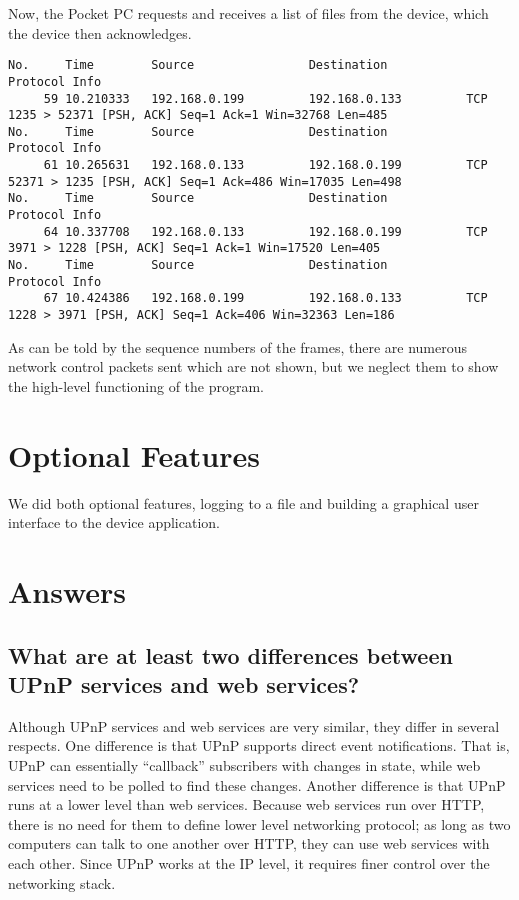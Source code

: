 \documentclass[11pt]{report}
\newcommand{\Section}[1]{\newpage \section{#1}}
\begin{document}
Now, the Pocket PC requests and receives a list of files from the device, which the device then acknowledges.

\begin{verbatim}
No.     Time        Source                Destination           Protocol Info
     59 10.210333   192.168.0.199         192.168.0.133         TCP      1235 > 52371 [PSH, ACK] Seq=1 Ack=1 Win=32768 Len=485
No.     Time        Source                Destination           Protocol Info
     61 10.265631   192.168.0.133         192.168.0.199         TCP      52371 > 1235 [PSH, ACK] Seq=1 Ack=486 Win=17035 Len=498
No.     Time        Source                Destination           Protocol Info
     64 10.337708   192.168.0.133         192.168.0.199         TCP      3971 > 1228 [PSH, ACK] Seq=1 Ack=1 Win=17520 Len=405
No.     Time        Source                Destination           Protocol Info
     67 10.424386   192.168.0.199         192.168.0.133         TCP      1228 > 3971 [PSH, ACK] Seq=1 Ack=406 Win=32363 Len=186
\end{verbatim}

As can be told by the sequence numbers of the frames, there are numerous network control packets sent which are not shown, but we neglect them to show the high-level functioning of the program.

\Section{Optional Features}

We did both optional features, logging to a file and building a graphical user interface to the device application.

\Section{Answers}

\subsection{What are at least two differences between UPnP services and web services?}

Although UPnP services and web services are very similar, they differ in several respects. One difference is that UPnP supports direct event notifications. That is, UPnP can essentially ``callback'' subscribers with changes in state, while web services need to be polled to find these changes. Another difference is that UPnP runs at a lower level than web services. Because web services run over HTTP, there is no need for them to define lower level networking protocol; as long as two computers can talk to one another over HTTP, they can use web services with each other. Since UPnP works at the IP level, it requires finer control over the networking stack.
\end{document}
